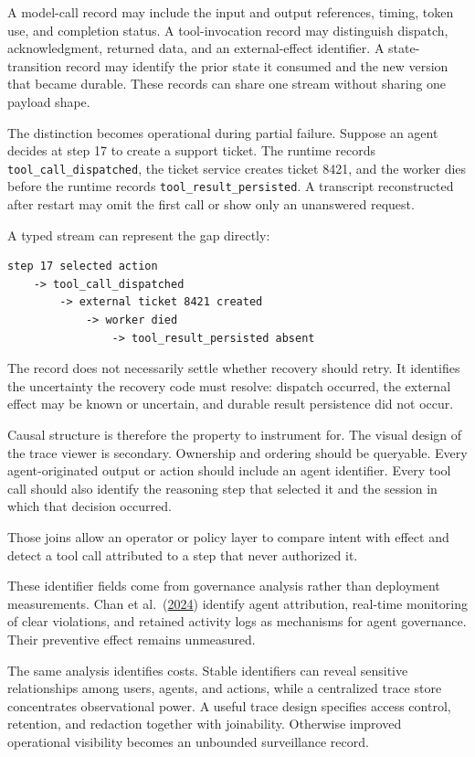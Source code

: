 A model-call record may include the input and output references, timing, token use, and completion status. A tool-invocation record may distinguish dispatch, acknowledgment, returned data, and an external-effect identifier. A state-transition record may identify the prior state it consumed and the new version that became durable. These records can share one stream without sharing one payload shape.

The distinction becomes operational during partial failure. Suppose an agent decides at step 17 to create a support ticket. The runtime records \texttt{tool\_call\_dispatched}, the ticket service creates ticket 8421, and the worker dies before the runtime records \texttt{tool\_result\_persisted}. A transcript reconstructed after restart may omit the first call or show only an unanswered request.

A typed stream can represent the gap directly:

\begin{verbatim}
step 17 selected action
    -> tool_call_dispatched
        -> external ticket 8421 created
            -> worker died
                -> tool_result_persisted absent
\end{verbatim}

The record does not necessarily settle whether recovery should retry. It identifies the uncertainty the recovery code must resolve: dispatch occurred, the external effect may be known or uncertain, and durable result persistence did not occur.

Causal structure is therefore the property to instrument for. The visual design of the trace viewer is secondary. Ownership and ordering should be queryable. Every agent-originated output or action should include an agent identifier. Every tool call should also identify the reasoning step that selected it and the session in which that decision occurred.

Those joins allow an operator or policy layer to compare intent with effect and detect a tool call attributed to a step that never authorized it.

These identifier fields come from governance analysis rather than deployment measurements. Chan et al.~(\href{https://arxiv.org/abs/2401.13138}{2024}) identify agent attribution, real-time monitoring of clear violations, and retained activity logs as mechanisms for agent governance. Their preventive effect remains unmeasured.

The same analysis identifies costs. Stable identifiers can reveal sensitive relationships among users, agents, and actions, while a centralized trace store concentrates observational power. A useful trace design specifies access control, retention, and redaction together with joinability. Otherwise improved operational visibility becomes an unbounded surveillance record.


